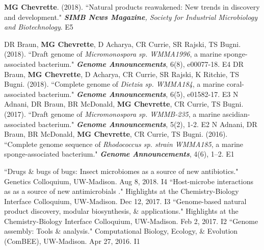\begin{cvpubs}
  \cvpub
    {\textbf{MG Chevrette}. (2018). ``Natural products reawakened: New trends in discovery and development." \textit{\textbf{SIMB News Magazine}, Society for Industrial Microbiology and Biotechnology}. }  %
    {E5} %
\end{cvpubs}
\begin{cvpubs}
  \cvpub
    {DR Braun, \textbf{MG Chevrette}, D Acharya, CR Currie, SR Rajski, TS Bugni. (2018). ``Draft genome of \textit{Micromonospora sp. WMMA1996}, a marine sponge-associated bacterium." \textit{\textbf{Genome Announcements}}, 6(8), e00077-18. \textbf{\textit{}} }  %
    {E4} %
  \cvpub
    {DR Braun, \textbf{MG Chevrette}, D Acharya, CR Currie, SR Rajski, K Ritchie, TS Bugni. (2018). ``Complete genome of \textit{Dietzia sp. WMMA184}, a marine coral-associated bacterium." \textit{\textbf{Genome Announcements}}, 6(5), e01582-17. \textbf{\textit{}} } %
    {E3} %
  \cvpub
    {N Adnani, DR Braun, BR McDonald, \textbf{MG Chevrette}, CR Currie, TS Bugni. (2017). ``Draft genome of \textit{Micromonospora sp. WMMB-235}, a marine ascidian-associated bacterium." \textit{\textbf{Genome Announcements}}, 5(2), 1-2. \textbf{\textit{}} } %
    {E2} %
  \cvpub
  {N Adnani, DR Braun, BR McDonald, \textbf{MG Chevrette}, CR Currie, TS Bugni. (2016). ``Complete genome sequence of \textit{Rhodococcus sp. strain WMMA185}, a marine sponge-associated bacterium." \textit{\textbf{Genome Announcements}}, 4(6), 1–2. \textbf{\textit{}}} %
    {E1} %
\end{cvpubs}


\begin{cvpubs} 
  \cvpub
    {``Drugs \& bugs of bugs: Insect microbiomes as a source of new antibiotics." Genetics Colloquium, UW-Madison. Aug 8, 2018.} %
    {I4} %
  \cvpub
    {``Host-microbe interactions as as a source of new antimicrobials
." Highlights at the Chemistry-Biology Interface Colloquium, UW-Madison. Dec 12, 2017.} %
    {I3} %
  \cvpub
    {``Genome-based natural product discovery, modular biosynthesis, \& applications." Highlights at the Chemistry-Biology Interface Colloquium, UW-Madison. Feb 2, 2017.} %
    {I2} %
  \cvpub
    {``Genome assembly: Tools \& analysis." Computational Biology, Ecology, \& Evolution (ComBEE), UW-Madison. Apr 27, 2016.} %
    {I1} %
\end{cvpubs}


